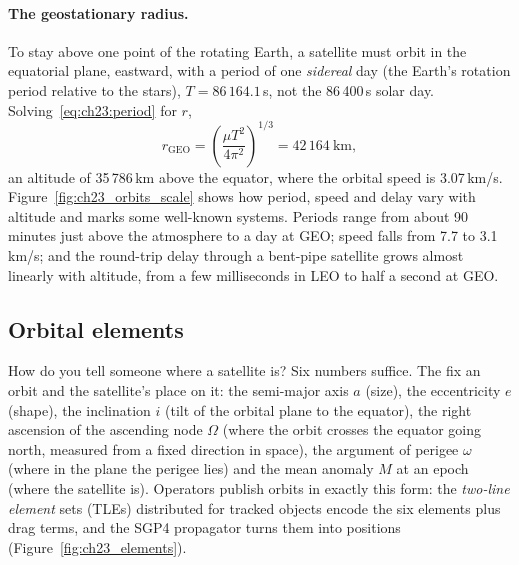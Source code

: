 \paragraph{The geostationary radius.} To stay above one point of the rotating Earth, a satellite
must orbit in the equatorial plane, eastward, with a period of one \emph{sidereal} day (the
Earth's rotation period relative to the stars), $T=86\,164.1$\,s, not the 86\,400\,s solar day.
Solving~\eqref{eq:ch23:period} for $r$,
\begin{equation}
r_{\text{GEO}}=\left(\frac{\mu T^2}{4\pi^2}\right)^{1/3}=42\,164\ \text{km},
\end{equation}
an altitude of 35\,786\,km above the equator, where the orbital speed is 3.07\,km/s.
Figure~\ref{fig:ch23_orbits_scale} shows how period, speed and delay vary with altitude and
marks some well-known systems. Periods range from about 90 minutes just above the atmosphere to
a day at GEO; speed falls from 7.7 to 3.1\,km/s; and the round-trip delay through a bent-pipe
satellite grows almost linearly with altitude, from a few milliseconds in LEO to half a second
at GEO.


\subsection{Orbital elements}

How do you tell someone where a satellite is? Six numbers suffice. The  fix an orbit and the satellite's place on it: the semi-major axis $a$ (size), the
eccentricity $e$ (shape), the inclination $i$ (tilt of the orbital plane to the equator), the right
ascension of the ascending node $\Omega$ (where the orbit crosses the equator going north, measured
from a fixed direction in space), the argument of perigee $\omega$ (where in the plane the perigee
lies) and the mean anomaly $M$ at an epoch (where the satellite is). Operators publish orbits in
exactly this form: the \emph{two-line element} sets (TLEs) distributed for tracked objects encode
the six elements plus drag terms, and the SGP4 propagator turns them into positions
(Figure~\ref{fig:ch23_elements}).

